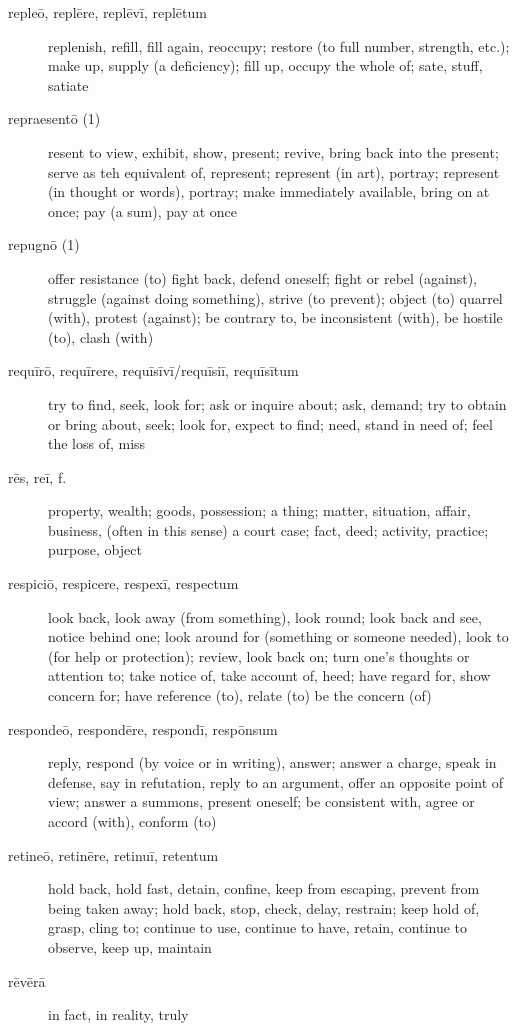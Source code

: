\begin{description}
    \item[repleō, replēre, replēvī, replētum] replenish, refill, fill again, reoccupy; restore (to full number, strength, etc.); make up, supply (a deficiency); fill up, occupy the whole of; sate, stuff, satiate
    \item[repraesentō (1)] resent to view, exhibit, show, present; revive, bring back into the present; serve as teh equivalent of, represent; represent (in art), portray; represent (in thought or words), portray; make immediately available, bring on at once; pay (a sum), pay at once
    \item[repugnō (1)] offer resistance (to) fight back, defend oneself; fight or rebel (against), struggle (against doing something), strive (to prevent); object (to) quarrel (with), protest (against); be contrary to, be inconsistent (with), be hostile (to), clash (with)
    \item[requīrō, requīrere, requīsīvī/requīsiī, requīsītum] try to find, seek, look for; ask or inquire about; ask, demand; try to obtain or bring about, seek; look for, expect to find; need, stand in need of; feel the loss of, miss
    \item[rēs, reī, f.] property, wealth; goods, possession; a thing; matter, situation, affair, business, (often in this sense) a court case; fact, deed; activity, practice; purpose, object
    \item[respiciō, respicere, respexī, respectum] look back, look away (from something), look round; look back and see, notice behind one; look around for (something or someone needed), look to (for help or protection); review, look back on; turn one's thoughts or attention to; take notice of, take account of, heed; have regard for, show concern for; have reference (to), relate (to) be the concern (of)
    \item[respondeō, respondēre, respondī, respōnsum] reply, respond (by voice or in writing), answer; answer a charge, speak in defense, say in refutation, reply to an argument, offer an opposite point of view; answer a summons, present oneself; be consistent with, agree or accord (with), conform (to)
    \item[retineō, retinēre, retinuī, retentum] hold back, hold fast, detain, confine, keep from escaping, prevent from being taken away; hold back, stop, check, delay, restrain; keep hold of, grasp, cling to; continue to use, continue to have, retain, continue to observe, keep up, maintain
    \item[rēvērā] in fact, in reality, truly

\end{description}
